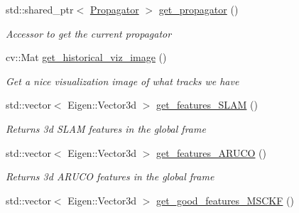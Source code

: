 \begin{DoxyCompactItemize}
\mbox{\label{classov__msckf_1_1VioManager_a8b1118aec3492d8d4c4291e00c084e84}} 
std\+::shared\+\_\+ptr$<$ \hyperlink{classov__msckf_1_1Propagator}{Propagator} $>$ \hyperlink{classov__msckf_1_1VioManager_a8b1118aec3492d8d4c4291e00c084e84}{get\+\_\+propagator} ()
\begin{DoxyCompactList}\small\item\em Accessor to get the current propagator \end{DoxyCompactList}\item 
\mbox{\label{classov__msckf_1_1VioManager_a52b2da9f2acc6df2b88cf8bf7cacfc32}} 
cv\+::\+Mat \hyperlink{classov__msckf_1_1VioManager_a52b2da9f2acc6df2b88cf8bf7cacfc32}{get\+\_\+historical\+\_\+viz\+\_\+image} ()
\begin{DoxyCompactList}\small\item\em Get a nice visualization image of what tracks we have \end{DoxyCompactList}\item 
\mbox{\label{classov__msckf_1_1VioManager_a32f00c78c24062b4de0b58bcc1bcfe70}} 
std\+::vector$<$ Eigen\+::\+Vector3d $>$ \hyperlink{classov__msckf_1_1VioManager_a32f00c78c24062b4de0b58bcc1bcfe70}{get\+\_\+features\+\_\+\+S\+L\+AM} ()
\begin{DoxyCompactList}\small\item\em Returns 3d S\+L\+AM features in the global frame \end{DoxyCompactList}\item 
\mbox{\label{classov__msckf_1_1VioManager_ae28e92d6c8c6747108aaebb971d8b4fd}} 
std\+::vector$<$ Eigen\+::\+Vector3d $>$ \hyperlink{classov__msckf_1_1VioManager_ae28e92d6c8c6747108aaebb971d8b4fd}{get\+\_\+features\+\_\+\+A\+R\+U\+CO} ()
\begin{DoxyCompactList}\small\item\em Returns 3d A\+R\+U\+CO features in the global frame \end{DoxyCompactList}\item 
\mbox{\label{classov__msckf_1_1VioManager_a6f44315b0084e276598d4ce508574e4b}} 
std\+::vector$<$ Eigen\+::\+Vector3d $>$ \hyperlink{classov__msckf_1_1VioManager_a6f44315b0084e276598d4ce508574e4b}{get\+\_\+good\+\_\+features\+\_\+\+M\+S\+C\+KF} ()

\end{DoxyCompactItemize}
